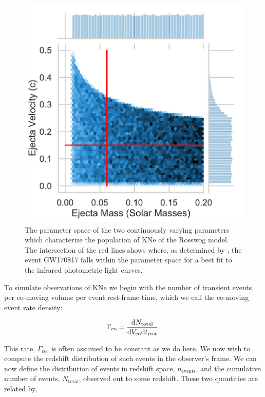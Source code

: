 \begin{figure}[t!]
  \centering
  \includegraphics[scale=0.55]{figures/Rosswog_parameter_dist}
  \caption{The parameter space of the two continuously varying parameters which characterize the population of KNe of the Rosswog model. The intersection of the red lines shows where, as determined by \citep{Rosswog2018}, the event GW170817 falls within the parameter space for a best fit to the infrared photometric light curves.}\label{fig: ross_params}
\end{figure}

To simulate observations of KNe we begin with the number of transient events per co-moving volume per event rest-frame time, which we call the co-moving event rate density:

\begin{equation}\label{eqn:erd}
   \Gamma_{\mathrm{co}} =\frac{\mathrm{d} N_{\mathrm{total}}}{\mathrm{d} V_{\mathrm{co}}\mathrm{d} t_{\mathrm{rest}}}.
\end{equation}\par

This rate, $\Gamma_{\mathrm{co}}$, is often assumed to be constant as we do here. We now wish to compute the redshift distribution of such events in the observer's frame. We can now define the distribution of events in redshift space, $n_{\mathrm{events}}$, and the cumulative number of events, $N_{\mathrm{total}}$, observed out to some redshift. These two quantities are related by,

